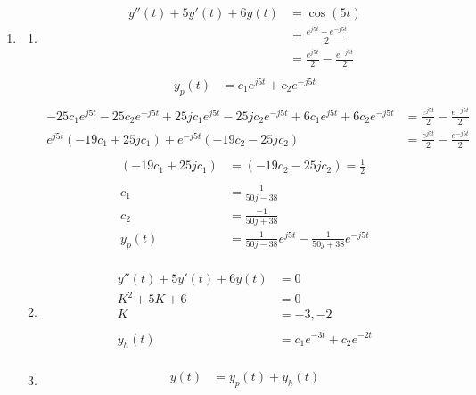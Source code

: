 \documentclass[10pt,a4paper, margin=1in]{article}
\begin{document}
\begin{enumerate}
\item %
    \begin{enumerate}
    \item %
    \begin{align*}
        y''(t) + 5y'(t) + 6y(t) & = \cos(5t)\\
        & = \frac{e^{j5t} - e^{-j5t}}{2}\\
        & = \frac{e^{j5t}}{2} - \frac{e^{-j5t}}{2}\\
    \end{align*}
    \begin{align*}
        y_p(t) & = c_1e^{j5t} + c_2e^{-j5t}\\
    \end{align*}
    \begin{align*}
        -25c_1e^{j5t} - 25c_2e^{-j5t} + 25jc_1e^{j5t} - 25jc_2e^{-j5t} + 6c_1e^{j5t} + 6c_2e^{-j5t} & = \frac{e^{j5t}}{2} - \frac{e^{-j5t}}{2}\\
        e^{j5t} \left(-19c_1 + 25jc_1\right) + e^{-j5t} \left(-19c_2 - 25jc_2\right) & = \frac{e^{j5t}}{2} - \frac{e^{-j5t}}{2}\\
    \end{align*}
    \begin{align*}
        \left(-19c_1 + 25jc_1\right) & = \left(-19c_2 - 25jc_2\right) = \frac{1}{2}\\
        & \\
        c_1 & = \frac{1}{50j - 38} \\
        c_2 & = \frac{-1}{50j + 38} \\
        y_p(t) & = \frac{1}{50j - 38}e^{j5t} - \frac{1}{50j + 38}e^{-j5t}\\
    \end{align*}
    \item %
    \begin{align*}
        y''(t) + 5y'(t) + 6y(t) & = 0\\
        K^2 + 5K + 6 & = 0\\
        K & = -3, -2\\
        & \\
        y_h(t) & = c_1e^{-3t} + c_2e^{-2t}\\
    \end{align*}
	\item %
    \begin{align*}
        y(t) & = y_p(t) + y_h(t)\\

\end{align*}
\end{enumerate}
\end{enumerate}
\end{document}
